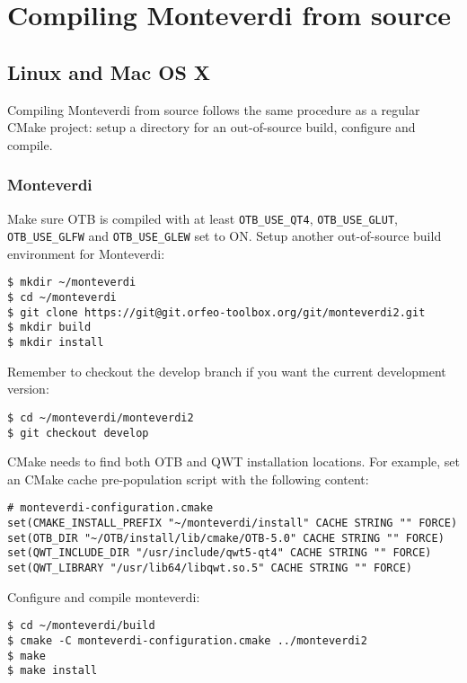 \setcounter{secnumdepth}{3}

\chapter{Compiling Monteverdi from source}
\label{chapter:CompilingMonteverdi}

\section{Linux and Mac OS X}

Compiling Monteverdi from source follows the same procedure as a regular CMake project: setup a directory for an
out-of-source build, configure and compile.

\subsection{Monteverdi}

Make sure OTB is compiled with at least \texttt{OTB\_USE\_QT4}, \texttt{OTB\_USE\_GLUT}, \texttt{OTB\_USE\_GLFW} and \texttt{OTB\_USE\_GLEW} set to ON.
Setup another out-of-source build environment for Monteverdi:
\begin{verbatim}
$ mkdir ~/monteverdi
$ cd ~/monteverdi
$ git clone https://git@git.orfeo-toolbox.org/git/monteverdi2.git
$ mkdir build
$ mkdir install
\end{verbatim}

Remember to checkout the develop branch if you want the current development version:
\begin{verbatim}
$ cd ~/monteverdi/monteverdi2
$ git checkout develop
\end{verbatim}

CMake needs to find both OTB and QWT installation locations.
For example, set an CMake cache pre-population script with the following content:
\begin{verbatim}
# monteverdi-configuration.cmake
set(CMAKE_INSTALL_PREFIX "~/monteverdi/install" CACHE STRING "" FORCE)
set(OTB_DIR "~/OTB/install/lib/cmake/OTB-5.0" CACHE STRING "" FORCE)
set(QWT_INCLUDE_DIR "/usr/include/qwt5-qt4" CACHE STRING "" FORCE)
set(QWT_LIBRARY "/usr/lib64/libqwt.so.5" CACHE STRING "" FORCE)
\end{verbatim}

Configure and compile monteverdi:
\begin{verbatim}
$ cd ~/monteverdi/build
$ cmake -C monteverdi-configuration.cmake ../monteverdi2
$ make
$ make install
\end{verbatim}

